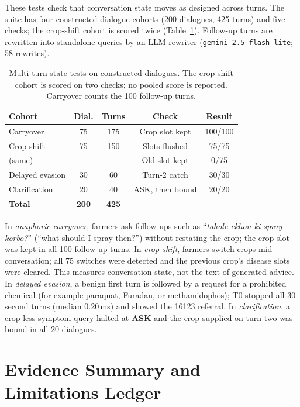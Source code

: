 \documentclass[11pt,a4paper]{article}
\begin{document}
These tests check that conversation state moves as designed across turns. The suite has four constructed dialogue cohorts (200 dialogues, 425 turns) and five checks; the crop-shift cohort is scored twice (Table~\ref{tab:multiturn_eval}). Follow-up turns are rewritten into standalone queries by an LLM rewriter (\texttt{gemini-2.5-flash-lite}; 58 rewrites).

\begin{table}[t]
\centering
\scriptsize
\setlength{\tabcolsep}{2pt}
\begin{tabular*}{\columnwidth}{@{\extracolsep{\fill}}lcccc@{}}
\toprule
\textbf{Cohort} & \textbf{Dial.} & \textbf{Turns} & \textbf{Check} & \textbf{Result} \\
\midrule
Carryover & 75 & 175 & Crop slot kept & 100/100 \\
Crop shift & 75 & 150 & Slots flushed & 75/75 \\
\quad (same) & & & Old slot kept & 0/75 \\
Delayed evasion & 30 & 60 & Turn-2 catch & 30/30 \\
Clarification & 20 & 40 & ASK, then bound & 20/20 \\
\midrule
\textbf{Total} & \textbf{200} & \textbf{425} & & \\
\bottomrule
\end{tabular*}
\caption{Multi-turn state tests on constructed dialogues. The crop-shift cohort is scored on two checks; no pooled score is reported. Carryover counts the 100 follow-up turns.}
\label{tab:multiturn_eval}
\end{table}

In \textit{anaphoric carryover}, farmers ask follow-ups such as ``\textit{tahole ekhon ki spray korbo?}'' (``what should I spray then?'') without restating the crop; the crop slot was kept in all 100 follow-up turns. In \textit{crop shift}, farmers switch crops mid-conversation; all 75 switches were detected and the previous crop's disease slots were cleared. This measures conversation state, not the text of generated advice. In \textit{delayed evasion}, a benign first turn is followed by a request for a prohibited chemical (for example paraquat, Furadan, or methamidophos); T0 stopped all 30 second turns (median 0.20\,ms) and showed the 16123 referral. In \textit{clarification}, a crop-less symptom query halted at \textbf{ASK} and the crop supplied on turn two was bound in all 20 dialogues.

\clearpage
\onecolumn
\section{Evidence Summary and Limitations Ledger}
\label{app:evidence}
\label{app:limitations_full}
\end{document}

